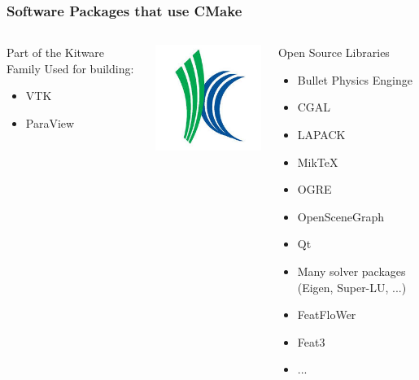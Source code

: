 \begin{frame}
  \frametitle{Software Packages that use CMake}
  \vspace{-1cm}

  \begin{columns}

     {

      \begin{block}{Part of the Kitware Family}
        Used for building:
        \begin{itemize}
          \item VTK 
          \item ParaView 
        \end{itemize}
      \end{block}
      \begin{center}
      \includegraphics[width=0.4 \textwidth]{img/kw-logo.png}
    \end{center}
    }
     {
      \begin{block}{Open Source Libraries}
        \begin{itemize}
          \item Bullet Physics Enginge 
          \item CGAL 
          \item LAPACK 
          \item MikTeX 
          \item OGRE  
          \item OpenSceneGraph  
          \item Qt  
          \item Many solver packages (Eigen, Super-LU, ...)
          \item FeatFloWer  
          \item Feat3  
          \item ...  
        \end{itemize}
      \end{block}
    }
\end{columns}
\end{frame}

